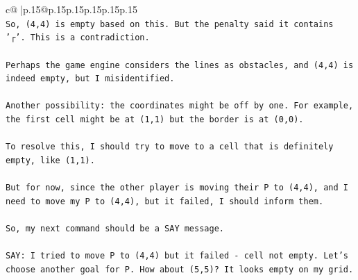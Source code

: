 \documentclass{article}
\begin{document}
{\begin{supertabular}{c@{$\;$}|p{.15\linewidth}@{}p{.15\linewidth}p{.15\linewidth}p{.15\linewidth}p{.15\linewidth}p{.15\linewidth}}
{{{\\ 
\texttt{So, (4,4) is empty based on this. But the penalty said it contains '┌'. This is a contradiction.} \\
\\ 
\texttt{Perhaps the game engine considers the lines as obstacles, and (4,4) is indeed empty, but I misidentified.} \\
\\ 
\texttt{Another possibility: the coordinates might be off by one. For example, the first cell might be at (1,1) but the border is at (0,0).} \\
\\ 
\texttt{To resolve this, I should try to move to a cell that is definitely empty, like (1,1).} \\
\\ 
\texttt{But for now, since the other player is moving their P to (4,4), and I need to move my P to (4,4), but it failed, I should inform them.} \\
\\ 
\texttt{So, my next command should be a SAY message.} \\
\\ 
\texttt{SAY: I tried to move P to (4,4) but it failed {-} cell not empty. Let's choose another goal for P. How about (5,5)? It looks empty on my grid.} \\
            }
        }
    }
     \\ \\


\end{supertabular}}
\end{document}
